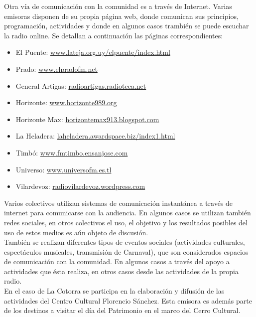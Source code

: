 Otra vía de comunicación con la comunidad es a través de Internet. Varias emisoras disponen de su propia página web, donde comunican sus principios, programación, actividades y donde en algunos casos trambién se puede escuchar la radio online. Se detallan a continuación las páginas correspondientes:

\begin{itemize}
  \item El Puente: \href{http://www.lateja.org.uy/elpuente/index.html}{www.lateja.org.uy/elpuente/index.html}
  \item Prado: \href{http://www.elpradofm.net}{www.elpradofm.net}
  \item General Artigas: \href{http://radioartigas.radioteca.net}{radioartigas.radioteca.net}
  \item Horizonte: \href{http://www.horizonte989.org}{www.horizonte989.org}
  \item Horizonte Max: \href{http://horizontemax913.blogspot.com}{horizontemax913.blogspot.com}
  \item La Heladera: \href{http://laheladera.awardspace.biz/index1.html}{laheladera.awardspace.biz/index1.html}
  \item Timbó: \href{http://www.fmtimbo.ensanjose.com}{www.fmtimbo.ensanjose.com}
  \item Universo: \href{http://www.universofm.es.tl}{www.universofm.es.tl}
  \item Vilardevoz: \href{http://radiovilardevoz.wordpress.com}{radiovilardevoz.wordpress.com}
\end{itemize}

Varios colectivos utilizan sistemas de comunicación instantánea a través de internet para comunicarse con la audiencia. En algunos casos se utilizan también redes sociales, en otros colectivos el uso, el objetivo y los resultados posibles del uso de estos medios es aún objeto de discusión.\\

También se realizan diferentes tipos de eventos sociales (actividades culturales, espectáculos musicales, transmisión de Carnaval), que son considerados espacios de comunicación con la comunidad. En algunos casos a través del apoyo a actividades que ésta realiza, en otros casos desde las actividades de la propia radio.\\

En el caso de La Cotorra se participa en la elaboración y difusión de las actividades del Centro Cultural Florencio Sánchez. Esta emisora es además parte de los destinos a visitar el día del Patrimonio en el marco del Cerro Cultural.\\

